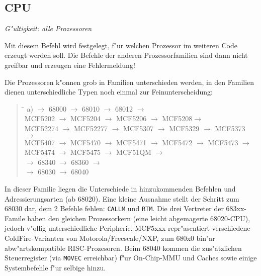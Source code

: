 \documentclass[12pt,a4paper,twoside]{report}
\makeatletter
\newcommand{\tty}[1]{{\tt #1}}
\newcommand{\ttindex}[1]{\index{#1@{\tt #1}}}
\makeatother
\begin{document}

\subsection{CPU}
\label{SectCPU}
\ttindex{CPU}

{\em G"ultigkeit: alle Prozessoren}

Mit diesem Befehl wird festgelegt, f"ur welchen Prozessor im weiteren
Code erzeugt werden soll.  Die Befehle der anderen Prozessorfamilien
sind dann nicht greifbar und erzeugen eine Fehlermeldung!
\par
Die Prozessoren k"onnen grob in Familien unterschieden werden, in den
Familien dienen unterschiedliche Typen noch einmal zur Feinunterscheidung:
\begin{quote}
\begin{tabbing}
\hspace{0.7cm} \= \kill
a)  $\rightarrow$ 68000 $\rightarrow$ 68010 $\rightarrow$ 68012 $\rightarrow$ \\
   \> MCF5202 $\rightarrow$ MCF5204 $\rightarrow$ MCF5206 $\rightarrow$ MCF5208$\rightarrow$ \\
   \> MCF52274 $\rightarrow$ MCF52277 $\rightarrow$ MCF5307 $\rightarrow$ MCF5329 $\rightarrow$ MCF5373 $\rightarrow$ \\
   \> MCF5407 $\rightarrow$ MCF5470 $\rightarrow$ MCF5471 $\rightarrow$ MCF5472 $\rightarrow$ MCF5473 $\rightarrow$ \\
   \> MCF5474 $\rightarrow$ MCF5475 $\rightarrow$ MCF51QM $\rightarrow$ \\
    $\rightarrow$ 68340 $\rightarrow$ 68360 $\rightarrow$ \\
    $\rightarrow$ 68030 $\rightarrow$ 68040
\end{tabbing}
\end{quote}
In dieser Familie liegen die Unterschiede in hinzukommenden Befehlen
und Adressierungsarten (ab 68020).  Eine kleine Ausnahme stellt der
Schritt zum 68030 dar, dem 2 Befehle fehlen: \tty{CALLM} und \tty{RTM}.
Die drei Vertreter der 683xx-Famile haben den gleichen Prozessorkern (eine
leicht abgemagerte 68020-CPU), jedoch v"ollig unterschiedliche Peripherie.
MCF5xxx repr"asentiert verschiedene ColdFire-Varianten von Motorola/Freescale/NXP,
zum 680x0 bin"ar abw"artskompatible RISC-Prozesoren. Beim 68040 kommen die zus"atzlichen
Steuerregister (via \tty{MOVEC} erreichbar) f"ur On-Chip-MMU und Caches
sowie einige Systembefehle f"ur selbige hinzu.
\end{document}
